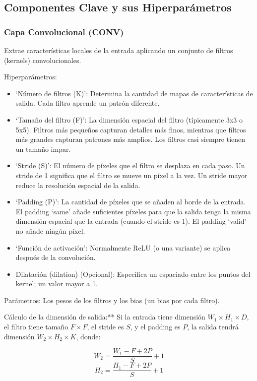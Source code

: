 \documentclass{article}
\begin{document}
\subsection{Componentes Clave y sus Hiperparámetros}

\subsubsection{Capa Convolucional (CONV)}

Extrae características locales de la entrada aplicando un conjunto de filtros (kernels) convolucionales.

Hiperparámetros:

\begin{itemize}
    \item `Número de filtros (K)':  Determina la cantidad de mapas de características de salida.  Cada filtro aprende un patrón diferente.
    \item `Tamaño del filtro (F)':  La dimensión espacial del filtro (típicamente 3x3 o 5x5).  Filtros más pequeños capturan detalles más finos, mientras que filtros más grandes capturan patrones más amplios. Los filtros casi siempre tienen un tamaño impar.
    \item `Stride (S)':  El número de píxeles que el filtro se desplaza en cada paso.  Un stride de 1 significa que el filtro se mueve un píxel a la vez.  Un stride mayor reduce la resolución espacial de la salida.
    \item `Padding (P)':  La cantidad de píxeles que se añaden al borde de la entrada.  El padding `same' añade suficientes píxeles para que la salida tenga la misma dimensión espacial que la entrada (cuando el stride es 1). El padding `valid' no añade ningún píxel.
    \item `Función de activación':  Normalmente ReLU (o una variante) se aplica después de la convolución.
    \item Dilatación (dilation) (Opcional): Especifica un espaciado entre los puntos del kernel; un valor mayor a 1.
\end{itemize}

Parámetros: Los pesos de los filtros y los bias (un bias por cada filtro).

Cálculo de la dimensión de salida:** Si la entrada tiene dimensión \(W_1 \times H_1 \times D\), el filtro tiene tamaño \(F \times F\), el stride es \(S\), y el padding es \(P\), la salida tendrá dimensión \(W_2 \times H_2 \times K\), donde:

    \[
    W_2 = \frac{W_1 - F + 2P}{S} + 1
    \]
    \[
    H_2 = \frac{H_1 - F + 2P}{S} + 1
    \]
\end{document}
